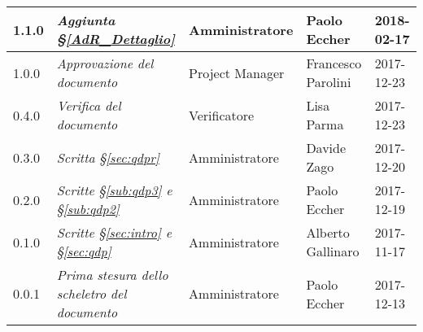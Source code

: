 \begin{longtable}[H]{C{2cm}|C{4cm}|C{3cm}|C{3cm}|R{2cm}}
		1.1.0 & \emph{Aggiunta  §\ref{AdR_Dettaglio}} & Amministratore &  Paolo Eccher & 2018-02-17 \\
		\hline
		
		1.0.0 & \emph{Approvazione del documento} & Project Manager &  Francesco Parolini & 2017-12-23 \\
		\hline
		
		0.4.0  & \emph{Verifica del documento} & Verificatore & Lisa Parma & 2017-12-23 \\
		\hline
		
		0.3.0 & \emph{Scritta  §\ref{sec:qdpr}} & Amministratore & Davide Zago & 2017-12-20 \\
		\hline
		
		0.2.0 & \emph{Scritte §\ref{sub:qdp3} e §\ref{sub:qdp2}} &  Amministratore & Paolo Eccher & 2017-12-19 \\
		\hline
		
		0.1.0 & \emph{Scritte  §\ref{sec:intro} e §\ref{sec:qdp}} & Amministratore & Alberto Gallinaro & 2017-11-17 \\
		\hline
		
		0.0.1 & \emph{Prima stesura dello scheletro del documento} & Amministratore & Paolo Eccher &  2017-12-13 \\
		
	\end{longtable}


\clearpage